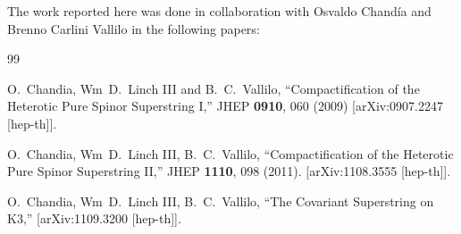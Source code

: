 \documentclass[9pt]{beamer}
\begin{document}
The work reported here was done in collaboration with Osvaldo Chand\'ia and Brenno Carlini Vallilo in the following papers: 
\begin{thebibliography}{99}
\footnotesize{

  

  

  
  O.~Chandia, Wm~D.~Linch III and B.~C.~Vallilo,
  ``Compactification of the Heterotic Pure Spinor Superstring I,''
  JHEP {\bf 0910}, 060 (2009)
  [arXiv:0907.2247 [hep-th]].
  
  O.~Chandia, Wm~D.~Linch III, B.~C.~Vallilo,
  ``Compactification of the Heterotic Pure Spinor Superstring II,''
  JHEP {\bf 1110}, 098 (2011).
  [arXiv:1108.3555 [hep-th]].
  
  O.~Chandia, Wm~D.~Linch III, B.~C.~Vallilo,
  ``The Covariant Superstring on K3,''
  [arXiv:1109.3200 [hep-th]].

}%

\end{thebibliography}
\end{document}
